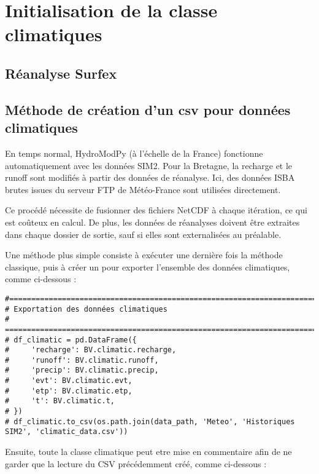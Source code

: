 \section{Initialisation de la classe climatiques}
\label{sec:initialisation_climatiques}

\subsection{Réanalyse Surfex}
\label{sec:reanalyse_surfex}

\subsection{Méthode de création d'un csv pour données climatiques}
\label{sec:csv_donnees_climatiques}

En temps normal, HydroModPy (à l’échelle de la France) fonctionne automatiquement avec les données SIM2. Pour la Bretagne, la recharge et le runoff sont modifiés à partir des données de réanalyse. Ici, des données ISBA brutes issues du serveur FTP de Météo-France sont utilisées directement.

Ce procédé nécessite de fusionner des fichiers NetCDF à chaque itération, ce qui est coûteux en calcul. De plus, les données de réanalyses doivent être extraites dans chaque dossier de sortie, sauf si elles sont externalisées au préalable.

Une méthode plus simple consiste à exécuter une dernière fois la méthode classique, puis à créer un  pour exporter l’ensemble des données climatiques, comme ci-dessous :

\begin{verbatim}
#============================================================================= 
# Exportation des données climatiques 
# ============================================================================= 
# df_climatic = pd.DataFrame({
#     'recharge': BV.climatic.recharge,
#     'runoff': BV.climatic.runoff,
#     'precip': BV.climatic.precip,
#     'evt': BV.climatic.evt,
#     'etp': BV.climatic.etp,
#     't': BV.climatic.t,
# })
# df_climatic.to_csv(os.path.join(data_path, 'Meteo', 'Historiques SIM2', 'climatic_data.csv'))
\end{verbatim}

Ensuite, toute la classe climatique peut etre mise en commentaire afin de ne garder que la lecture du CSV précédemment créé, comme ci-dessous :

